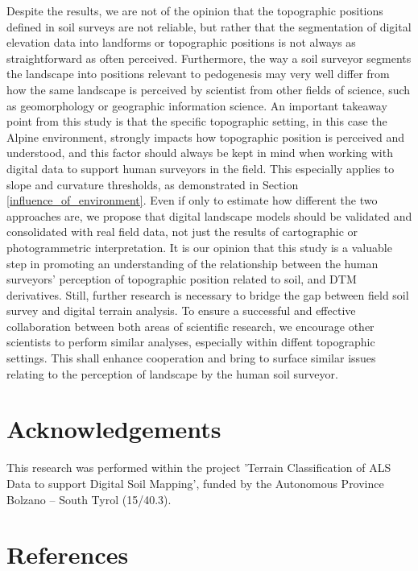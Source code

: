 \documentclass[preprint,12pt,authoryear]{elsarticle}
\begin{document}
Despite the results, we are not of the opinion that the topographic positions defined in  soil surveys are not reliable, but rather that the segmentation of digital elevation data into landforms or topographic positions is not always as straightforward as often perceived. Furthermore, the way a soil surveyor segments the landscape into positions relevant to pedogenesis may very well differ from how the same landscape is perceived by scientist from other fields of science, such as geomorphology or geographic information science. An important takeaway point from this study is that the specific topographic setting, in this case the Alpine environment, strongly impacts how topographic position is perceived and understood, and this factor should always be kept in mind when working with digital data to support human surveyors in the field. This especially applies to slope and curvature thresholds, as demonstrated in Section\,\ref{influence_of_environment}. Even if only to estimate how different the two approaches are, we propose that digital landscape models should be validated and consolidated with real field data, not just the results of cartographic or photogrammetric interpretation. It is our opinion that this study is a valuable step in promoting an understanding of the relationship between the human surveyors' perception of topographic position related to soil, and DTM derivatives. Still, further research is necessary to bridge the gap between field soil survey and digital terrain analysis. To ensure a successful and effective collaboration between both areas of scientific research, we encourage other scientists to perform similar analyses, especially within diffent topographic settings. This shall enhance cooperation and bring to surface similar issues relating to the perception of landscape by the human soil surveyor.

\section*{Acknowledgements} This research was performed within the project 'Terrain Classification of ALS Data to support Digital Soil Mapping', funded by the Autonomous Province Bolzano -- South Tyrol (15/40.3).
\section*{References}

\end{document}

